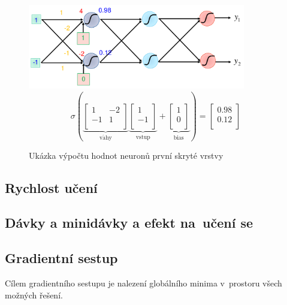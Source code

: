 \begin{figure}[ht]
    \onehalfspacing
    \centering
    \includegraphics[height=10em]{images/6_maticova-operace}
    $$
    \sigma \left(
    \underbrace{
        \left[ \begin{matrix}
        1 & -2 \\
        -1 & 1 \\
        \end{matrix} \right]
    }_{\mathrm{v\acute{a}hy}}
    \underbrace{
        \left[ \begin{matrix}
        1 \\
        -1 \\
        \end{matrix} \right]
    }_{\mathrm{vstup}} +
    \underbrace{
        \left[ \begin{matrix}
        1 \\
        0 \\
        \end{matrix} \right]
    }_{\mathrm{bias}}
    \right) = \left[ \begin{matrix}
    0.98 \\
    0.12 \\
    \end{matrix} \right]
    $$
    \caption{Ukázka výpočtu hodnot neuronů první skryté vrstvy}
\end{figure}
\FloatBarrier

\subsection{Rychlost učení}

\subsection{Dávky a minidávky a efekt na~učení se}

\subsection{Gradientní sestup}

Cílem gradientního sestupu je nalezení globálního minima v~prostoru všech možných řešení.

